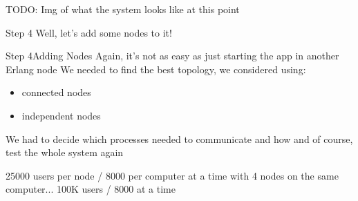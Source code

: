 \documentclass[utf8]{beamer}
\begin{document}
\begin{frame}
TODO: Img of what the system looks like at this point
\end{frame}

\begin{frame}{Step 4}
Well, let's add some nodes to it!
\end{frame}

\begin{frame}{Step 4}{Adding Nodes}
Again, it's not as easy as just starting the app in another Erlang node
\pause
We needed to find the best topology, we considered using:
	\begin{itemize}
		\item connected nodes
		\item independent nodes
	\end{itemize}
\pause
We had to decide which processes needed to communicate and how
\pause
and of course, test the whole system again
\end{frame}

\begin{frame}
25000 users per node / 8000 per computer at a time
\pause
with 4 nodes on the same computer...
\pause
100K users / 8000 at a time
\end{frame}
\end{document}
